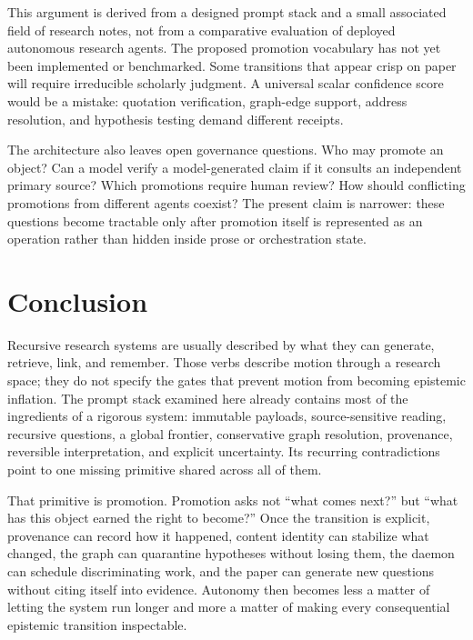 \documentclass[11pt]{article}
\begin{document}
This argument is derived from a designed prompt stack and a small associated field of research notes, not from a comparative evaluation of deployed autonomous research agents. The proposed promotion vocabulary has not yet been implemented or benchmarked. Some transitions that appear crisp on paper will require irreducible scholarly judgment. A universal scalar confidence score would be a mistake: quotation verification, graph-edge support, address resolution, and hypothesis testing demand different receipts.



The architecture also leaves open governance questions. Who may promote an object? Can a model verify a model-generated claim if it consults an independent primary source? Which promotions require human review? How should conflicting promotions from different agents coexist? The present claim is narrower: these questions become tractable only after promotion itself is represented as an operation rather than hidden inside prose or orchestration state.



\section*{Conclusion}



Recursive research systems are usually described by what they can generate, retrieve, link, and remember. Those verbs describe motion through a research space; they do not specify the gates that prevent motion from becoming epistemic inflation. The prompt stack examined here already contains most of the ingredients of a rigorous system: immutable payloads, source-sensitive reading, recursive questions, a global frontier, conservative graph resolution, provenance, reversible interpretation, and explicit uncertainty. Its recurring contradictions point to one missing primitive shared across all of them.



That primitive is promotion. Promotion asks not “what comes next?” but “what has this object earned the right to become?” Once the transition is explicit, provenance can record how it happened, content identity can stabilize what changed, the graph can quarantine hypotheses without losing them, the daemon can schedule discriminating work, and the paper can generate new questions without citing itself into evidence. Autonomy then becomes less a matter of letting the system run longer and more a matter of making every consequential epistemic transition inspectable.
\end{document}
